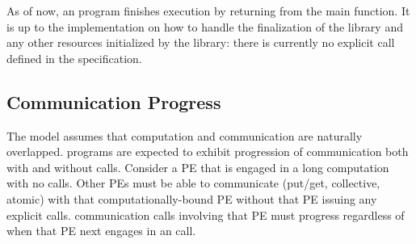 %
%
As of now, an \openshmem program finishes execution by returning from the main function. 
It is up to the implementation on how to handle the finalization of the
\openshmem library and any other resources initialized by the library:
there is currently no explicit call defined in the \openshmem specification.

\subsection{Communication Progress}

The \openshmem model assumes that computation and communication are
naturally overlapped.  \openshmem programs are expected to exhibit
progression of communication both with and without \openshmem calls.
Consider a \ac{PE} that is engaged in a long computation with no \openshmem calls.
Other \ac{PE}s must be able to communicate (put/get,
collective, atomic) with that computationally-bound \ac{PE} without that \ac{PE}
issuing any explicit \openshmem calls. \openshmem communication calls involving that \ac{PE} must progress
regardless of when that \ac{PE} next engages in an \openshmem call.

